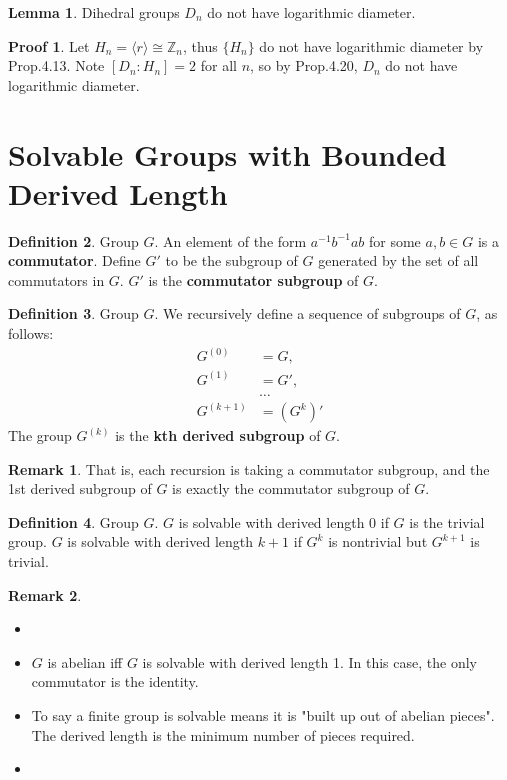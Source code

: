 \documentclass{book}
\newcommand{\Z}{\mathbb{Z}}
\newcommand{\define}[1]{\textbf{#1}}
\newcommand{\inner}[1]{\langle #1 \rangle}
\theoremstyle{definition}
\newtheorem{lemma}{Lemma}[chapter]
\newtheorem{definition}[lemma]{Definition}
\theoremstyle{remarkstyle}
\newtheorem*{remark}{Remark}%
\newtheorem*{myproof}{Proof}%
\begin{document}
\begin{lemma}
    Dihedral groups $D_{n} $ do not have logarithmic diameter. 
\end{lemma}
\begin{myproof}
    Let $H_{n} = \inner{r} \cong \Z_{n} $, thus $\{H_{n}\} $ do not have logarithmic diameter by Prop.4.13. Note $[D_{n}:H_{n}] =2 $ for all $n$, so by Prop.4.20, $D_{n} $ do not have logarithmic diameter. \newline
\end{myproof}


\section{Solvable Groups with Bounded Derived Length}
\begin{definition}
    Group $G$. An element of the form $a^{-1}b^{-1}ab $ for some $a,b\in G$ is a \define{commutator}. Define $G'$ to be the subgroup of $G$ generated by the set of all commutators in $G$. $G'$ is the \define{commutator subgroup} of $G$. \newline
\end{definition}


\begin{definition}
    Group $G$. We recursively define a sequence of subgroups of $G$, as follows: 
    \begin{align*}
        G^{(0)} &= G, \\
        G^{(1)} &= G', \\
        &\dots \\
        G^{(k+1)} &= (G^{k})'
    \end{align*}
    The group $G^{(k)} $ is the \define{kth derived subgroup} of $G$.
\end{definition}
\begin{remark}
    That is, each recursion is taking a commutator subgroup, and the 1st derived subgroup of $G$ is exactly the commutator subgroup of $G$. \newline
\end{remark}


\begin{definition}
    Group $G$. $G$ is solvable with derived length 0 if $G$ is the trivial group. $G$ is solvable with derived length $k+1$ if $G^{k} $ is nontrivial but $G^{k+1} $ is trivial.
\end{definition}
\begin{remark}
\begin{itemize}
    \item[]
    \item $G$ is abelian iff $G$ is solvable with derived length 1. In this case, the only commutator is the identity.
    \item To say a finite group is solvable means it is "built up out of abelian pieces". The derived length is the minimum number of pieces required.
    \item[] 
\end{itemize}
\end{remark}
\end{document}
